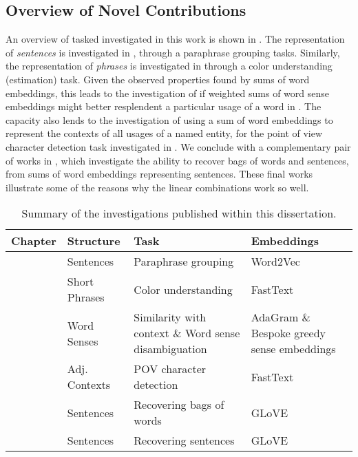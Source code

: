 \documentclass{book}
\begin{document}
\subsection{Overview of Novel Contributions}
An overview of tasked investigated in this work is shown in .
The representation of \emph{sentences} is investigated in , through a paraphrase grouping tasks.
Similarly, the representation of \emph{phrases} is investigated in  through a color understanding (estimation) task.
Given the observed properties found by sums of word embeddings,
this leads to the investigation of if weighted sums of word sense embeddings might better resplendent a particular usage of a word in .
The capacity also lends to the investigation of using a sum of word embeddings to represent the contexts of all usages of a named entity, for the point of view character detection task investigated in .
We conclude with a complementary pair of works in  , which investigate the ability to recover bags of words and sentences, from sums of word embeddings representing sentences.
These final works illustrate some of the reasons why the linear combinations work so well.

\begin{table}
	\begin{tabularx}{\textwidth}{llXX}
		\toprule
		\textbf{Chapter} & \textbf{Structure} & Task & \textbf{Embeddings}\\
		\midrule
		\Cref{SentVecMeaning}  & Sentences & Paraphrase grouping &  Word2Vec \citep{mikolovSkip}\\
		\Cref{ColorEst} & Short Phrases & Color understanding & FastText \citep{bojanowski2016enriching}\\
		\Cref{RefittingSenses} & Word Senses & Similarity with context \& Word sense disambiguation %
			& AdaGram \citep{AdaGrams} \& Bespoke greedy sense embeddings\\
		\Cref{NovelPerspective} & Adj. Contexts & POV character detection & FastText \citep{bojanowski2016enriching}\\
		\Cref{BOWgen} & Sentences & Recovering bags of words & GLoVE \citep{pennington2014glove} \\
		\Cref{SOWE2Sent} & Sentences & Recovering sentences & GLoVE \citep{pennington2014glove} \\
		\bottomrule
	\end{tabularx}
	\caption{Summary of the investigations published within this dissertation. \label{tbl:methodsandtasks}}
\end{table}
\end{document}
